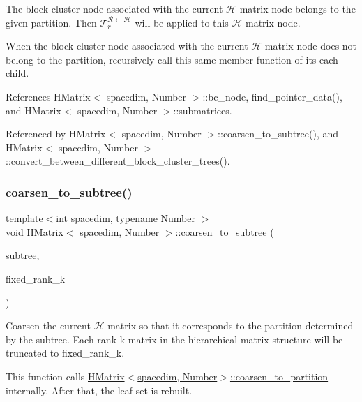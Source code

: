 The block cluster node associated with the current $\mathcal{H}$-\/matrix node belongs to the given {\ttfamily partition}. Then $\mathcal{T}_r^{\mathcal{R} \leftarrow \mathcal{H}}$ will be applied to this $\mathcal{H}$-\/matrix node.

When the block cluster node associated with the current $\mathcal{H}$-\/matrix node does not belong to the {\ttfamily partition}, recursively call this same member function of its each child.

References H\+Matrix$<$ spacedim, Number $>$\+::bc\+\_\+node, find\+\_\+pointer\+\_\+data(), and H\+Matrix$<$ spacedim, Number $>$\+::submatrices.



Referenced by H\+Matrix$<$ spacedim, Number $>$\+::coarsen\+\_\+to\+\_\+subtree(), and H\+Matrix$<$ spacedim, Number $>$\+::convert\+\_\+between\+\_\+different\+\_\+block\+\_\+cluster\+\_\+trees().

\mbox{\label{classHMatrix_a27c7390b792e6e47ab2861616a997d99}} 
\subsubsection{\texorpdfstring{coarsen\+\_\+to\+\_\+subtree()}{coarsen\_to\_subtree()}}
{\footnotesize\ttfamily template$<$int spacedim, typename Number $>$ \\
void \hyperlink{classHMatrix}{H\+Matrix}$<$ spacedim, Number $>$\+::coarsen\+\_\+to\+\_\+subtree (\begin{DoxyParamCaption}\item[{const \hyperlink{classBlockClusterTree}{Block\+Cluster\+Tree}$<$ spacedim, Number $>$ \&}]{subtree,  }\item[{const unsigned int}]{fixed\+\_\+rank\+\_\+k }\end{DoxyParamCaption})}

Coarsen the current $\mathcal{H}$-\/matrix so that it corresponds to the partition determined by the {\ttfamily subtree}. Each rank-\/k matrix in the hierarchical matrix structure will be truncated to {\ttfamily fixed\+\_\+rank\+\_\+k}.

This function calls {\ttfamily \hyperlink{classHMatrix_a525ad4d453f4f496b98cccb341c8b60b}{H\+Matrix$<$spacedim, Number$>$\+::coarsen\+\_\+to\+\_\+partition}} internally. After that, the leaf set is rebuilt.

